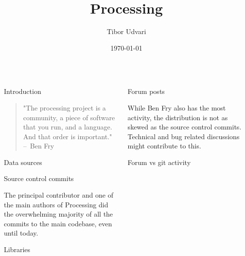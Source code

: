 \documentclass[final]{beamer}
\title{Processing}
\author{Tibor Udvari}
\institute{HEAD – Genève}
\date{\today}
\begin{document}
\begin{frame}[t]
  \begin{columns}[t]
    \begin{column}{.32\textwidth}
      \begin{block}{Introduction}
        \begin{quote}
          "The processing project is a community, a piece of software that you run, and a language. And that order is important." – Ben Fry \parencite[19:22]{artsatmit2017CASTSymposium2017}
          \end{quote}
      \end{block}
      \begin{block}{Data sources}
                
      \end{block}
      \begin{block}{Source control commits}

        
        The principal contributor and one of the main authors of Processing did the overwhelming majority of all the commits to the main codebase, even until today.
      \end{block}
      \begin{block}{Libraries}
        
        

      \end{block}

    \end{column}
    \begin{column}{.32\textwidth}
      \begin{block}{Forum posts}
        
        While Ben Fry also has the most activity, the distribution is not as skewed as the source control commits. Technical and bug related discussions might contribute to this.
      \end{block}
      \begin{block}{Forum vs git activity}
        
        
      \end{block}


\end{column}
\end{columns}
\end{frame}
\end{document}
